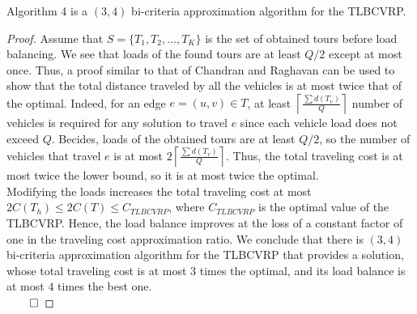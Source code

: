  \begin{theorem} 
Algorithm 4 is a $(3,4)$ bi-criteria approximation algorithm for the TLBCVRP.
\end{theorem} 
\begin{proof} Assume that $S=\{T_1, T_2,...,T_K\}$ is the set of obtained tours before load balancing. We see that loads of the found tours are at least $Q/2$ except at most once. Thus, a proof similar to that of Chandran and Raghavan can be used to show that the total distance traveled by all the vehicles is at most twice that of the optimal. Indeed, for an edge $e=(u,v) \in T$, at least $\left\lceil \frac{\sum\nolimits{d(T_v)}}{Q} \right\rceil$ number of vehicles is required for any solution to travel $e$ since each vehicle load does not exceed $Q$. Becides, loads of the obtained tours are at least $Q/2$, so the number of vehicles that travel $e$ is at most $2\left\lceil \frac{\sum\nolimits{d(T_v)}}{Q} \right\rceil$. Thus, the total traveling cost is at most twice the lower bound, so it is at most twice the optimal.\\
\indent Modifying the loads increases the total traveling cost at most $2C(T_h) \le 2C(T) \le C_{TLBCVRP}$, where $C_{TLBCVRP}$ is the optimal value of the TLBCVRP. Hence, the load balance improves at the loss of a constant factor of one in the traveling cost approximation ratio. We conclude that there is $(3,4)$ bi-criteria approximation algorithm for the TLBCVRP that provides a solution, whose total traveling cost is at most $3$ times the optimal, and its load balance is at most $4$ times the best one.\\
$\qed$
\end{proof}
